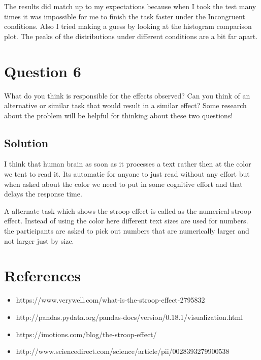 \documentclass[12pt]{article}%
\begin{document}
\newline The results did match up to my expectations because when I took the test many times it was impossible for me to finish the task faster under the Incongruent conditions. Also I tried making a guess by looking at the histogram comparison plot. The peaks of the distributions under different conditions are a bit far apart.

\section*{Question 6}
What do you think is responsible for the effects observed? Can you think of an alternative or similar task that would result in a similar effect? Some research about the problem will be helpful for thinking about these two questions!

\subsection*{Solution}
I think that human brain as soon as it processes a text rather then at the color we tent to read it. Its automatic for anyone to just read without any effort but when asked about the color we need to put in some cognitive effort and that delays the response time.

A alternate task which shows the stroop effect is called as the numerical stroop effect. Instead of using the color here different text sizes are used for numbers. the participants are asked to pick out numbers that are numerically larger and not larger just by size.

\newpage
\section*{References}

 \begin{itemize}
 
  \item https://www.verywell.com/what-is-the-stroop-effect-2795832
  
  \item http://pandas.pydata.org/pandas-docs/version/0.18.1/visualization.html

  \item https://imotions.com/blog/the-stroop-effect/
  
  \item http://www.sciencedirect.com/science/article/pii/0028393279900538
  
 \end{itemize}
 
 
 
 
\end{document}
